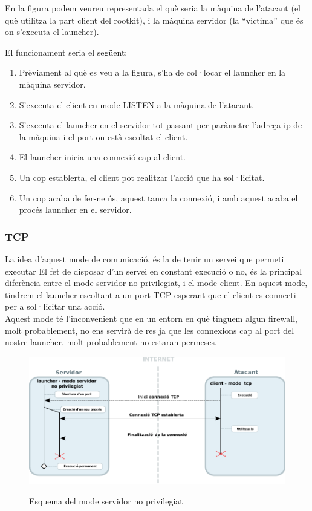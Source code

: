 En la figura podem veureu representada el què seria la màquina de l'atacant (el què utilitza la part client del rootkit),
i la màquina servidor (la ``victima'' que és on s'executa el launcher).

El funcionament seria el següent:
\begin{enumerate}
    \item Prèviament al què es veu a la figura, s'ha de col·locar el launcher en la màquina servidor.
    \item S'executa el client en mode LISTEN a la màquina de l'atacant.
    \item S'executa el launcher en el servidor tot passant per paràmetre l'adreça ip de la màquina i el port on està escoltat
        el client.
    \item El launcher inicia una connexió cap al client.
    \item Un cop establerta, el client pot realitzar l'acció que ha sol·licitat.
    \item Un cop acaba de fer-ne ús, aquest tanca la connexió, i amb aquest acaba el procés launcher en el servidor.
\end{enumerate}

\subsubsection{TCP}
La idea d'aquest mode de comunicació, és la de tenir un servei que permeti executar 
El fet de disposar d'un servei en constant execució o no, és la principal diferència entre el mode servidor
no privilegiat, i el mode client. En aquest mode, tindrem el launcher escoltant a un port TCP esperant que
el client es connecti per a sol·licitar una acció. \\

Aquest mode té l'inconvenient que en un entorn en què tinguem algun firewall, molt probablement, no ens 
servirà de res ja que les connexions cap al port del nostre launcher, molt probablement no estaran permeses. \\

\begin{figure}[htp]
    \centering
    \includegraphics[scale=1,keepaspectratio]{diagrames/solutionDesignUnprivilegedServerMode.pdf} \\
    \caption{Esquema del mode servidor no privilegiat}
    \label{fig:modeUnprivilegedServer}
\end{figure}


